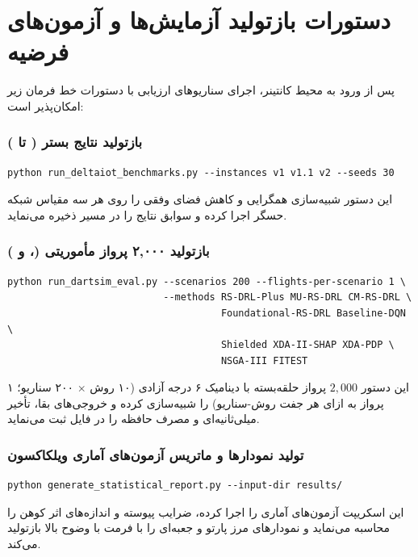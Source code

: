 \documentclass[oneside,openany,phd]{TMU-Thesis}
\begin{document}
\section{دستورات بازتولید آزمایش‌ها و آزمون‌های فرضیه}
\label{sec:app_reproduction_commands}

پس از ورود به محیط کانتینر، اجرای سناریوهای ارزیابی با دستورات خط فرمان زیر امکان‌پذیر است:

\subsubsection*{بازتولید نتایج بستر  ( تا )}
\begin{LTR}
\small
\begin{verbatim}
python run_deltaiot_benchmarks.py --instances v1 v1.1 v2 --seeds 30
\end{verbatim}
\end{LTR}
این دستور شبیه‌سازی همگرایی و کاهش فضای وفقی را روی هر سه مقیاس شبکه حسگر اجرا کرده و سوابق نتایج را در مسیر  ذخیره می‌نماید.

\subsubsection*{بازتولید ۲,۰۰۰ پرواز مأموریتی  (،  و )}
\begin{LTR}
\small
\begin{verbatim}
python run_dartsim_eval.py --scenarios 200 --flights-per-scenario 1 \
                           --methods RS-DRL-Plus MU-RS-DRL CM-RS-DRL \
                                     Foundational-RS-DRL Baseline-DQN \
                                     Shielded XDA-II-SHAP XDA-PDP \
                                     NSGA-III FITEST
\end{verbatim}
\end{LTR}
این دستور $2{,}000$ پرواز حلقه‌بسته با دینامیک ۶ درجه آزادی (۱۰ روش $\times$ ۲۰۰ سناریو؛ ۱ پرواز به ازای هر جفت روش-سناریو) را شبیه‌سازی کرده و خروجی‌های بقا، تأخیر میلی‌ثانیه‌ای و مصرف حافظه را در فایل \allowbreak{} ثبت می‌نماید.

\subsubsection*{تولید نمودارها و ماتریس آزمون‌های آماری ویلکاکسون}
\begin{LTR}
\small
\begin{verbatim}
python generate_statistical_report.py --input-dir results/
\end{verbatim}
\end{LTR}
این اسکریپت آزمون‌های آماری را اجرا کرده، ضرایب پیوسته و اندازه‌های اثر کوهن را محاسبه می‌نماید و نمودارهای مرز پارتو و جعبه‌ای را با فرمت  با وضوح بالا بازتولید می‌کند.

\newpage



\ifstandalone


\fi
\end{document}
